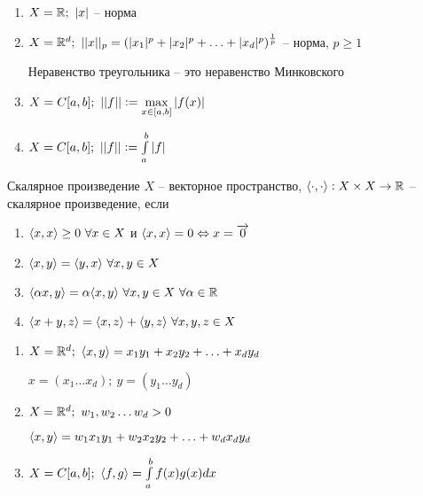 \documentclass[12pt]{article}
\begin{document}
\begin{Example}{}
    \begin{enumerate}
        \item $X = \mathbb R;\ |x|$ -- норма
        \item $X = \mathbb R^d;\ || x ||_p = (|x_1|^p + |x_2|^p + \ldots + |x_d|^p)^{\frac{1}{p}}$ -- норма, $p \geq 1$
        
        Неравенство треугольника -- это неравенство Минковского

        \item $X = C[a, b];\ || f || := \max\limits_{x \in [a, b]} |f(x)|$
        \item $X = C[a, b];\ || f || := \int\limits_a^b |f|$
    \end{enumerate}
\end{Example}

\begin{defin}{Скалярное произведение}
    $X$ -- векторное пространство, $\langle \cdot, \cdot \rangle : X \times X \to \mathbb R$ -- скалярное произведение, если

    \begin{enumerate}
        \item $\langle x, x \rangle \geq 0\ \forall x \in X$ и $\langle x, x \rangle = 0 \Leftrightarrow x = \overrightarrow{0}$
        \item $\langle x, y \rangle = \langle y, x \rangle\ \forall x, y \in X$
        \item $\q{\alpha x, y} = \alpha \q{x, y}\ \forall x, y \in X\ \forall \alpha \in \R$
        \item $\q{x + y, z} = \q{x, z} + \q{y, z}\ \forall x, y, z \in X$
    \end{enumerate}
\end{defin}

\begin{Example}{}
    \begin{enumerate}
        \item $X = \mathbb R^d;\ \langle x, y \rangle = x_1y_1 + x_2y_2 + \ldots + x_dy_d$
        
        $x = (x_1 \ldots x_d);\ y = (y_1 \ldots y_d)$

        \item $X = \mathbb R^d;\ w_1, w_2 \ldots w_d > 0$
        
        $\langle x, y \rangle = w_1x_1y_1 + w_2x_2y_2 + \ldots + w_dx_dy_d$

        \item $X = C[a, b];\ \langle f, g \rangle = \int\limits_a^b f(x)g(x)dx$
    \end{enumerate}
\end{Example}
\end{document}
